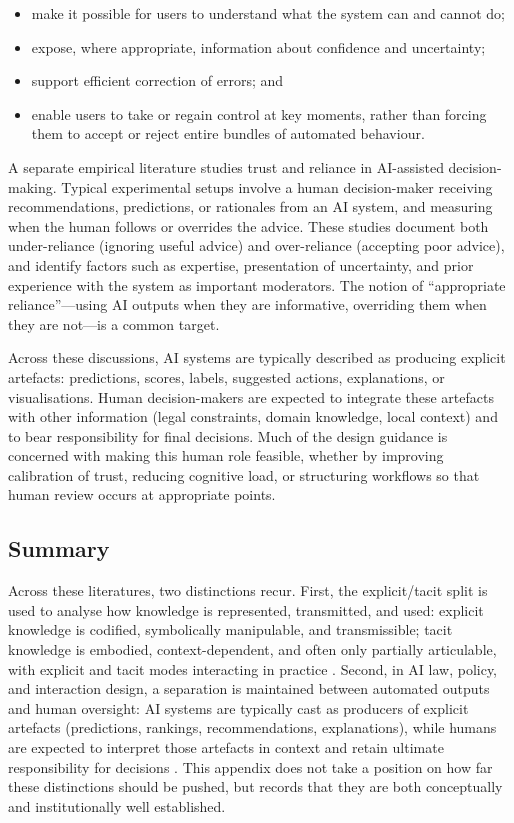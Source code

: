 \begin{itemize}
  \item make it possible for users to understand what the system can and cannot do;
  \item expose, where appropriate, information about confidence and uncertainty;
  \item support efficient correction of errors; and
  \item enable users to take or regain control at key moments, rather than forcing them to accept or reject entire bundles of automated behaviour.
\end{itemize}

A separate empirical literature studies trust and reliance in AI-assisted decision-making. Typical experimental setups involve a human decision-maker receiving recommendations, predictions, or rationales from an AI system, and measuring when the human follows or overrides the advice. These studies document both under-reliance (ignoring useful advice) and over-reliance (accepting poor advice), and identify factors such as expertise, presentation of uncertainty, and prior experience with the system as important moderators. The notion of ``appropriate reliance''—using AI outputs when they are informative, overriding them when they are not—is a common target.

Across these discussions, AI systems are typically described as producing explicit artefacts: predictions, scores, labels, suggested actions, explanations, or visualisations. Human decision-makers are expected to integrate these artefacts with other information (legal constraints, domain knowledge, local context) and to bear responsibility for final decisions. Much of the design guidance is concerned with making this human role feasible, whether by improving calibration of trust, reducing cognitive load, or structuring workflows so that human review occurs at appropriate points.

\subsection{Summary}

Across these literatures, two distinctions recur. First, the explicit/tacit split is used to analyse how knowledge is represented, transmitted, and used: explicit knowledge is codified, symbolically manipulable, and transmissible; tacit knowledge is embodied, context-dependent, and often only partially articulable, with explicit and tacit modes interacting in practice \cite{Polanyi1966,Nonaka1994,NonakaTakeuchi1995}. Second, in AI law, policy, and interaction design, a separation is maintained between automated outputs and human oversight: AI systems are typically cast as producers of explicit artefacts (predictions, rankings, recommendations, explanations), while humans are expected to interpret those artefacts in context and retain ultimate responsibility for decisions \cite{EUAIAct2024,Amershi2019}. This appendix does not take a position on how far these distinctions should be pushed, but records that they are both conceptually and institutionally well established.

